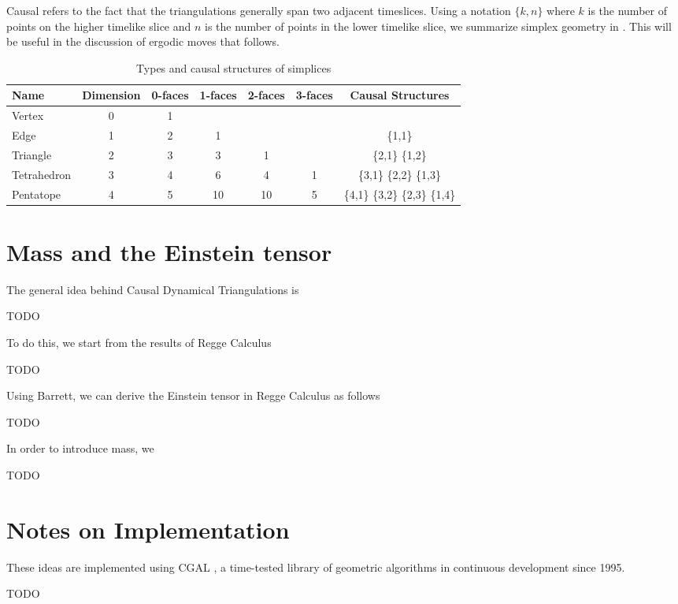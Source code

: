 \documentclass[12pt]{article}
\begin{document}
Causal refers to the fact that the triangulations generally span two adjacent timeslices. Using a notation $\{k,n\}$ where $k$ is the number of points on the higher timelike slice and $n$ is the number of points in the lower timelike slice, we summarize simplex geometry in . This will be useful in the discussion of ergodic moves that follows.

\begin{table}
\centering
\begin{tabular}{|l|c|c|c|c|c|c|}
\hline
Name & Dimension & 0-faces & 1-faces & 2-faces & 3-faces & Causal Structures \\
\hline
\hline
Vertex & 0 & 1 & & & & \\
Edge & 1 & 2 & 1 & & & \{1,1\} \\
Triangle & 2 & 3 & 3 & 1 & & \{2,1\} \{1,2\}\\
Tetrahedron & 3 & 4 & 6 & 4 & 1 & \{3,1\} \{2,2\} \{1,3\} \\
Pentatope & 4 & 5 & 10 & 10 & 5 & \{4,1\} \{3,2\} \{2,3\} \{1,4\} \\
\hline
\end{tabular}
\caption[Simplex types]{Types and causal structures of simplices}
\label{table:simplices}
\end{table}

\section{Mass and the Einstein tensor}

The general idea behind Causal Dynamical Triangulations is

TODO

To do this, we start from the results of Regge Calculus \cite{regge}

TODO

Using Barrett, we can derive the Einstein tensor in Regge Calculus as follows

TODO

In order to introduce mass, we 

TODO

\section{Notes on Implementation}

These ideas are implemented using CGAL \cite{cgal}, a time-tested library of geometric algorithms in continuous development since 1995.

TODO



\end{document}
